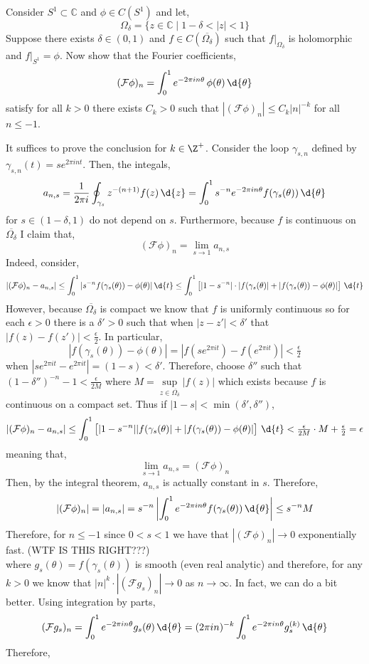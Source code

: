 \documentclass[12pt]{article}
\renewcommand{\C}{\mathbb{C}}
\renewcommand{\F}{\mathcal{F}}
\begin{document}
\begin{exercise}
Consider $S^1 \subset \C$ and $\phi \in C(S^1)$ and let,
\[ \Omega_\delta = \{ z \in \C \mid 1 - \delta < | z | < 1 \} \]
Suppose there exists $\delta \in (0,1)$ and $f \in C(\overline{\Omega_\delta})$ such that $f|_{\Omega_\delta}$ is holomorphic and $f |_{S^1} = \phi$. Now show that the Fourier coefficients,
\[ (\F \phi)_n =  \int_{0}^{1} e^{- 2\pi i n \theta} \, \phi(\theta) \, \d{\theta} \]
satisfy for all $k > 0$ there exists $C_k > 0$ such that $| (\F \phi)_n | \le C_k |n|^{-k}$ for all $n \le -1$.
\end{exercise}

It suffices to prove the conclusion for $k \in \Z^{+}$. Consider the loop $\gamma_{s, n}$ defined by $\gamma_{s, n}(t) = s e^{2 \pi i n t}$. Then, the integals,
\[ a_{n, s} = \frac{1}{2 \pi i} \oint_{\gamma_s} z^{-(n+1)} f(z) \, \d{z} = \int_0^{1} s^{-n} e^{-2 \pi i n \theta} f(\gamma_s(\theta)) \, \d{\theta}  \]
for $s \in (1 - \delta, 1)$ do not depend on $s$. Furthermore, because $f$ is continuous on $\overline{\Omega_\delta}$ I claim that, 
\[ (\F \phi)_n = \lim_{s \to 1} a_{n,s} \]
Indeed, consider,
\[ |(\F \phi)_n - a_{n, s}| \le \int_0^1 | s^{-n} f(\gamma_s(\theta)) - \phi(\theta) | \, \d{t} \le \int_0^1 \left[ |1 - s^{-n}| \cdot |f(\gamma_s(\theta)| + |f(\gamma_s(\theta)) - \phi(\theta) | \right] \, \d{t} \]
However, because $\overline{\Omega_\delta}$ is compact we know that $f$ is  uniformly continuous so for each $\epsilon > 0$ there is a $\delta' > 0$ such that when $| z - z'| < \delta'$ that $|f(z) - f(z')| < \frac{\epsilon}{2}$. In particular, 
\[ | f(\gamma_s(\theta)) - \phi(\theta)| = | f(s e^{2 \pi i t}) - f(e^{2 \pi i t}) | < \tfrac{\epsilon}{2} \]
when $| s e^{2 \pi i t} - e^{2 \pi i t} | = (1 - s) < \delta'$. Therefore, choose $\delta''$ such that $(1 - \delta'')^{-n} - 1 < \frac{\epsilon}{2 M}$ where $M = \sup\limits_{z \in \overline{\Omega_\delta}} | f(z) |$ which exists because $f$ is continuous on a compact set. Thus if $|1 - s| < \min{(\delta', \delta'')}$,
\[ |(\F \phi)_n - a_{n, s}| \le \int_0^1 \left[ | 1 - s^{-n}| |f(\gamma_s(\theta)| + |f(\gamma_s(\theta)) - \phi(\theta) | \right] \, \d{t} < \tfrac{\epsilon}{2 M} \cdot M + \tfrac{\epsilon}{2} = \epsilon \]
meaning that,
\[ \lim_{s \to 1} a_{n,s} = (\F \phi)_n \]
Then, by the integral theorem, $a_{n,s}$ is actually constant in $s$. Therefore,
\[ |(\F \phi)_n| = |a_{n, s}| = s^{-n} \left| \int_0^1 e^{-2\pi i n \theta} f(\gamma_{s}(\theta)) \, \d{\theta} \right| \le s^{-n} M \]
Therefore, for $n \le -1$ since $0 < s < 1$ we have that $| (\F \phi)_n | \to 0$ exponentially fast. (WTF IS THIS RIGHT???)
\bigskip\\
where $g_s(\theta) = f(\gamma_s(\theta))$ is smooth (even real analytic) and therefore, for any $k > 0$ we know that $|n|^k \cdot | (\F g_s)_n | \to 0$ as $n \to \infty$. In fact, we can do a bit better. Using integration by parts,
\[ (\F g_s)_n = \int_0^1 e^{-2\pi i n \theta} g_s(\theta) \, \d{\theta} = (2 \pi i n)^{-k} \int_0^1 e^{- 2 \pi i n \theta} g_s^{(k)} \, \d{\theta} \]
Therefore,
\end{document}
